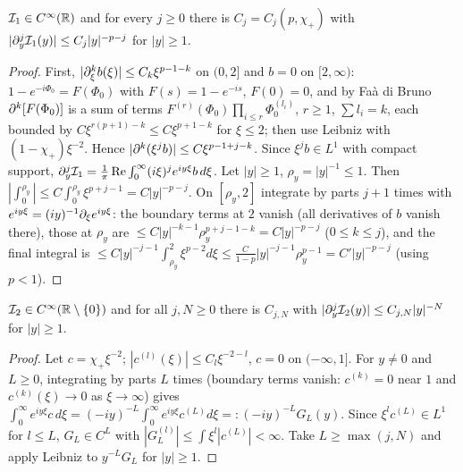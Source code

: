 \begin{lemma}
  \label{lem:c04_I1_bound}
  $\mathcal{I}_1\in C^\infty(\mathbb{R})$ and for every $j\ge0$ there is $C_j=C_j(p,\chi_+)$ with
  $|\partial_y^j\mathcal{I}_1(y)|\le C_j|y|^{-p-j}$ for $|y|\ge1$.
\end{lemma}
\begin{proof}
  First, $|\partial^k_\xi b(\xi)|\le C_k\xi^{p-1-k}$ on $(0,2]$ and $b=0$ on $[2,\infty)$: $1-e^{-i\Phi_0}=F(\Phi_0)$ with $F(s)=1-e^{-is}$, $F(0)=0$, and by
  Faà di Bruno $\partial^k[F(\Phi_0)]$ is a sum of terms $F^{(r)}(\Phi_0)\prod_{i\le r}\Phi_0^{(l_i)}$, $r\ge1$, $\sum l_i=k$, each bounded by
  $C\xi^{r(p+1)-k}\le C\xi^{p+1-k}$ for $\xi\le2$; then use Leibniz with $(1-\chi_+)\xi^{-2}$. Hence
  $|\partial^k(\xi^jb)|\le C\xi^{p-1+j-k}$. Since $\xi^jb\in L^1$ with compact support, $\partial_y^j\mathcal{I}_1=\frac1\pi\operatorname{Re}\int_0^\infty(i\xi)^je^{iy\xi}b\,d\xi$.
  Let $|y|\ge1$, $\rho_y=|y|^{-1}\le1$. Then $|\int_0^{\rho_y}|\le C\int_0^{\rho_y}\xi^{p+j-1}=C|y|^{-p-j}$. On $[\rho_y,2]$ integrate by parts $j+1$ times
  with $e^{iy\xi}=(iy)^{-1}\partial_\xi e^{iy\xi}$: the boundary terms at $2$ vanish (all derivatives of $b$ vanish there), those at $\rho_y$ are
  $\le C|y|^{-k-1}\rho_y^{p+j-1-k}=C|y|^{-p-j}$ ($0\le k\le j$), and the final integral is
  $\le C|y|^{-j-1}\int_{\rho_y}^2\xi^{p-2}d\xi\le\frac{C}{1-p}|y|^{-j-1}\rho_y^{p-1}=C'|y|^{-p-j}$ (using $p<1$).
\end{proof}

\begin{lemma}
  \label{lem:c04_I2_bound}
  $\mathcal{I}_2\in C^\infty(\mathbb{R}\setminus\{0\})$ and for all $j,N\ge0$ there is $C_{j,N}$ with
  $|\partial_y^j\mathcal{I}_2(y)|\le C_{j,N}|y|^{-N}$ for $|y|\ge1$.
\end{lemma}
\begin{proof}
  Let $c=\chi_+\xi^{-2}$; $|c^{(l)}(\xi)|\le C_l\xi^{-2-l}$, $c=0$ on $(-\infty,1]$. For $y\ne0$ and $L\ge0$, integrating by parts $L$ times
  (boundary terms vanish: $c^{(k)}=0$ near $1$ and $c^{(k)}(\xi)\to0$ as $\xi\to\infty$) gives
  $\int_0^\infty e^{iy\xi}c\,d\xi=(-iy)^{-L}\int_0^\infty e^{iy\xi}c^{(L)}d\xi=:(-iy)^{-L}G_L(y)$. Since $\xi^lc^{(L)}\in L^1$ for $l\le L$,
  $G_L\in C^L$ with $|G_L^{(l)}|\le\int\xi^l|c^{(L)}|<\infty$. Take $L\ge\max(j,N)$ and apply Leibniz to $y^{-L}G_L$ for $|y|\ge1$.
\end{proof}

